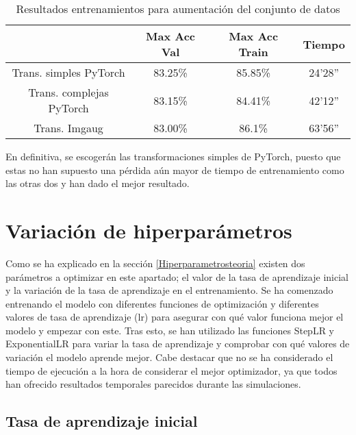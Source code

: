 \documentclass{report}
\begin{document}
\begin{table}[H]
\centering
\begin{tabular}{|c|c|c|c|}
\hline
\cellcolor[HTML]{FFFFFF}{\color[HTML]{000000} Transformaciones } & Max Acc Val & Max Acc Train  & Tiempo  \\ \hline
Trans. simples PyTorch                              & 83.25\%  &  85.85\%  & 24'28''      \\ \hline
Trans. complejas PyTorch                            & 83.15\%   &  84.41\%  & 42'12''     \\ \hline
Trans. Imgaug                                       & 83.00\%   &  86.1\%  & 63'56''    \\ \hline
\end{tabular}
\caption{Resultados entrenamientos para aumentación del conjunto de datos}
\label{tab:ResumenResultadosDataAUG}
\end{table}


En definitiva, se escogerán las transformaciones simples de PyTorch, puesto que estas no han supuesto una pérdida aún mayor de tiempo de entrenamiento como las otras dos y han dado el mejor resultado.





\newpage
\section{Variación de hiperparámetros}

Como se ha explicado en la sección \ref{Hiperparametrosteoria} existen dos parámetros a optimizar en este apartado; el valor de la tasa de aprendizaje inicial y la variación de la tasa de aprendizaje en el entrenamiento. Se ha comenzado entrenando el modelo con diferentes funciones de optimización y diferentes valores de tasa de aprendizaje (lr) para asegurar con qué valor funciona mejor el modelo y empezar con este. Tras esto, se han utilizado las funciones StepLR y ExponentialLR para variar la tasa de aprendizaje y comprobar con qué valores de variación el modelo aprende mejor. Cabe destacar que no se ha considerado el tiempo de ejecución a la hora de considerar el mejor optimizador, ya que todos han ofrecido resultados temporales parecidos durante las simulaciones.



\subsection{Tasa de aprendizaje inicial}
\end{document}
